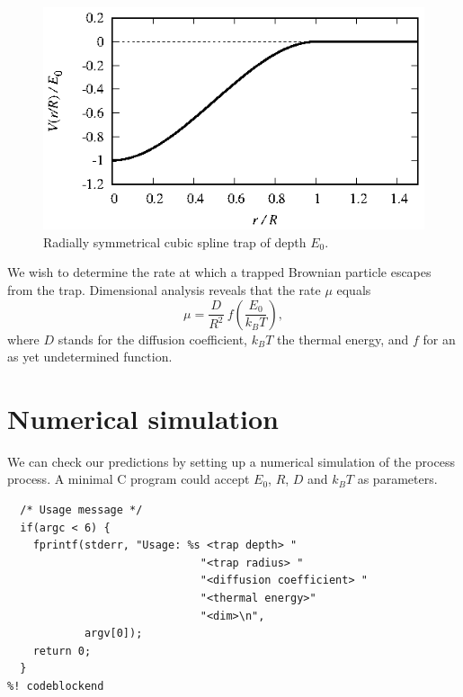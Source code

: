\documentclass{article}
\begin{document}
\begin{figure}
  \centering
  \includegraphics[width=\linewidth]{cubic_spline.eps}
  \caption{\label{cubic_spline}Radially symmetrical cubic spline trap of depth
           $E_0$.}
\end{figure}

We wish to determine the rate at which a trapped Brownian particle escapes from
the trap. Dimensional analysis reveals that the rate $\mu$ equals
\begin{equation}
\label{dimensional_analysis}
  \mu = \frac{D}{R^2}\ f\left(\frac{E_0}{k_BT}\right),
\end{equation}
where $D$ stands for the diffusion coefficient, $k_BT$ the thermal energy, and
$f$ for an as yet undetermined function.

\section{Numerical simulation}

We can check our predictions by setting up a numerical simulation of the process
process. A minimal C program could accept $E_0$, $R$, $D$ and $k_BT$ as
parameters.

\begin{lstlisting}[frame=single]
%! codeblock: usage_message
  /* Usage message */
  if(argc < 6) {
    fprintf(stderr, "Usage: %s <trap depth> "
                              "<trap radius> "
                              "<diffusion coefficient> "
                              "<thermal energy>"
                              "<dim>\n",
            argv[0]);
    return 0;
  }
%! codeblockend
\end{lstlisting}

\end{document}
